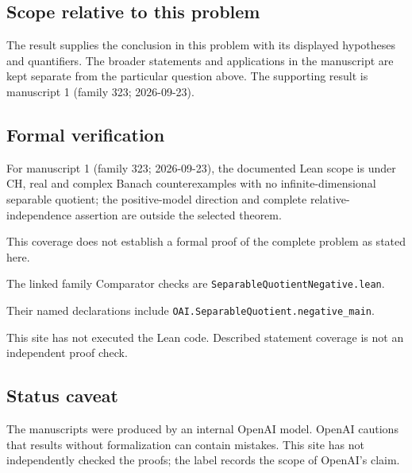 \documentclass[11pt]{article}
\begin{document}
\subsection{Scope relative to this problem}
The result supplies the conclusion in this problem with its displayed hypotheses and quantifiers. The broader statements and applications in the manuscript are kept separate from the particular question above. The supporting result is manuscript 1 (family 323; 2026-09-23).

\subsection{Formal verification}
For manuscript 1 (family 323; 2026-09-23), the documented Lean scope is under CH, real and complex Banach counterexamples with no infinite-dimensional separable quotient; the positive-model direction and complete relative-independence assertion are outside the selected theorem.

This coverage does not establish a formal proof of the complete problem as stated here.

The linked family Comparator checks are \texttt{SeparableQuotientNegative.lean}.

Their named declarations include \texttt{OAI.SeparableQuotient.negative\_main}.

This site has not executed the Lean code. Described statement coverage is not an independent proof check.

\subsection{Status caveat}
The manuscripts were produced by an internal OpenAI model. OpenAI cautions that results without formalization can contain mistakes. This site has not independently checked the proofs; the label records the scope of OpenAI's claim.
\end{document}
